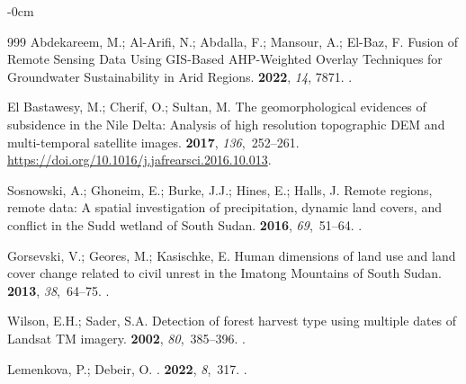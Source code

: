 \documentclass[jimaging,article,accept,pdftex,moreauthors]{Definitions/mdpi}
\begin{document}
\begin{adjustwidth}{-\extralength}{0cm}
\begin{thebibliography}{999}
Abdekareem, M.; Al-Arifi, N.; Abdalla, F.; Mansour, A.; El-Baz, F.
\newblock Fusion of Remote Sensing Data Using GIS-Based AHP-Weighted Overlay
  Techniques for Groundwater Sustainability in Arid Regions.
 {\bf 2022}, {\em 14}, 7871.
.

{El Bastawesy}, M.; Cherif, O.; Sultan, M.
\newblock The geomorphological evidences of subsidence in the Nile Delta:
  Analysis of high resolution topographic DEM and multi-temporal satellite
  images.
 {\bf 2017}, {\em  136},~252--261.
  {\url{https://doi.org/10.1016/j.jafrearsci.2016.10.013}}.

Sosnowski, A.; Ghoneim, E.; Burke, J.J.; Hines, E.; Halls, J.
\newblock Remote regions, remote data: A spatial investigation of
  precipitation, dynamic land covers, and conflict in the Sudd wetland of South
  Sudan.
 {\bf 2016}, {\em 69},~51--64.
.

Gorsevski, V.; Geores, M.; Kasischke, E.
\newblock Human dimensions of land use and land cover change related to civil
  unrest in the Imatong Mountains of South Sudan.
 {\bf 2013}, {\em 38},~64--75.
.

Wilson, E.H.; Sader, S.A.
\newblock Detection of forest harvest type using multiple dates of Landsat TM
  imagery.
 {\bf 2002}, {\em 80},~385--396.
.

Lemenkova, P.; Debeir, O.
.
 {\bf 2022}, {\em 8},~317.
.


\end{thebibliography}
\end{adjustwidth}
\end{document}
